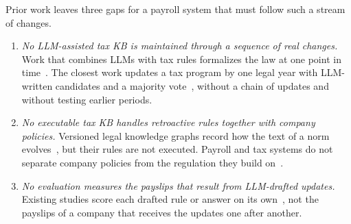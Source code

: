 Prior work leaves three gaps for a payroll system that must follow such a stream of changes.
\begin{enumerate}
  \item \emph{No LLM-assisted tax KB is maintained through a sequence of real changes.} Work that combines LLMs with tax rules formalizes the law at one point in time~\cite{veeramani2026neurosymbolic,lorenzo2025translating,jurayj2026tax}. The closest work updates a tax program by one legal year with LLM-written candidates and a majority vote~\cite{goganikhiabani2025maintaining}, without a chain of updates and without testing earlier periods.
  \item \emph{No executable tax KB handles retroactive rules together with company policies.} Versioned legal knowledge graphs record how the text of a norm evolves~\cite{demartim2025satgraph}, but their rules are not executed. Payroll and tax systems do not separate company policies from the regulation they build on~\cite{dumancic2021payroll,alhawari2026payroll}.
  \item \emph{No evaluation measures the payslips that result from LLM-drafted updates.} Existing studies score each drafted rule or answer on its own~\cite{goganikhiabani2025maintaining,jurayj2026tax}, not the payslips of a company that receives the updates one after another.
\end{enumerate}

